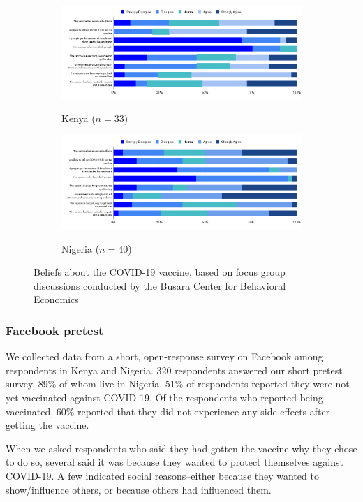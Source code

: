 \documentclass[letterpaper, 12pt, parskip=full,DIV=10]{scrartcl}
\begin{document}
\begin{figure}[htbp]
   \centering
   \begin{subfigure}{\textwidth}
  \centering
  \caption{Kenya ($n = 33$)}
  \includegraphics[width = \textwidth]{../../tables-figures/qual-beliefsKY.png} 
  \label{fig:qualKY}
\end{subfigure}
\begin{subfigure}{\textwidth}
  \centering
  \caption{Nigeria ($n = 40$)}
  \includegraphics[width = \textwidth]{../../tables-figures/qual-beliefsNG.png} 
  \label{fig:qualNG}
\end{subfigure}
   \caption{Beliefs about the COVID-19 vaccine, based on focus group discussions conducted by the Busara Center for Behavioral Economics}
   \label{fig:qual}
\end{figure}


\subsubsection{Facebook pretest}
We collected data from a short, open-response survey on Facebook among respondents in Kenya and Nigeria. 320 respondents answered our short pretest survey, 89\% of whom live in Nigeria. 51\% of respondents reported they were not yet vaccinated against COVID-19. Of the respondents who reported being vaccinated, 60\% reported that they did not experience any side effects after getting the vaccine.

When we asked respondents who said they had gotten the vaccine why they chose to do so, several said it was because they wanted to protect themselves against COVID-19. A few indicated social reasons--either because they wanted to show/influence others, or because others had influenced them.
\end{document}

